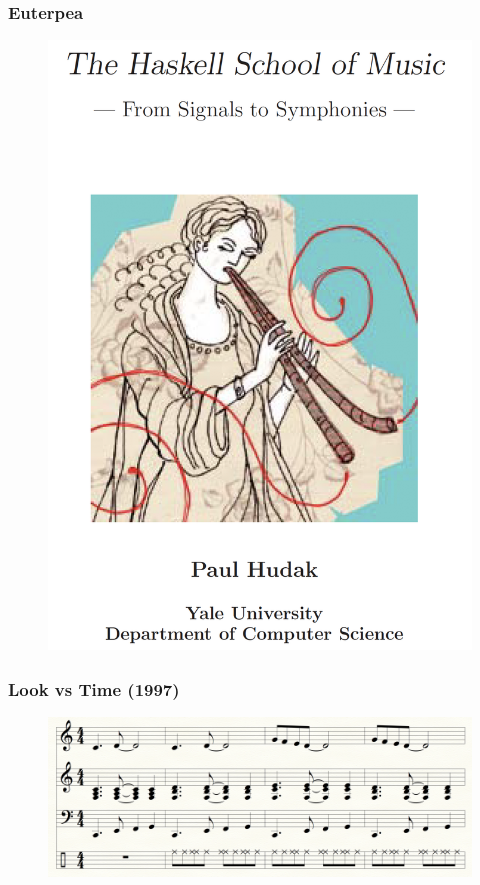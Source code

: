 \documentclass{beamer}
\begin{document}
\begin{frame}\frametitle{Euterpea}
\begin{figure}
\includegraphics[height=0.8\textheight]{hsom}
\end{figure}
\end{frame}

\begin{frame}\frametitle{Look vs Time (1997)}
\begin{figure}
\includegraphics[width=\textwidth]{lookVsTime}
\end{figure}
\end{frame}
\end{document}
